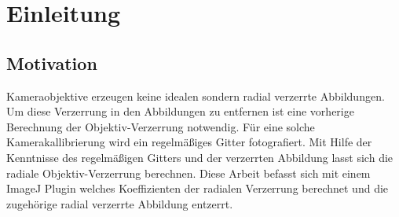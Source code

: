 \section{Einleitung}\label{sec:Introduction}




\subsection{Motivation}\label{sec:Motivation}

Kameraobjektive erzeugen keine idealen sondern radial verzerrte Abbildungen. Um diese Verzerrung in den Abbildungen zu entfernen ist eine vorherige Berechnung der Objektiv-Verzerrung notwendig. Für eine solche Kamerakallibrierung wird ein regelmäßiges Gitter fotografiert. Mit Hilfe der Kenntnisse des regelmäßigen Gitters und der verzerrten Abbildung lasst sich die radiale Objektiv-Verzerrung berechnen. Diese Arbeit befasst sich mit einem ImageJ Plugin welches Koeffizienten der radialen Verzerrung berechnet und die zugehörige radial verzerrte Abbildung entzerrt.



\newpage


















